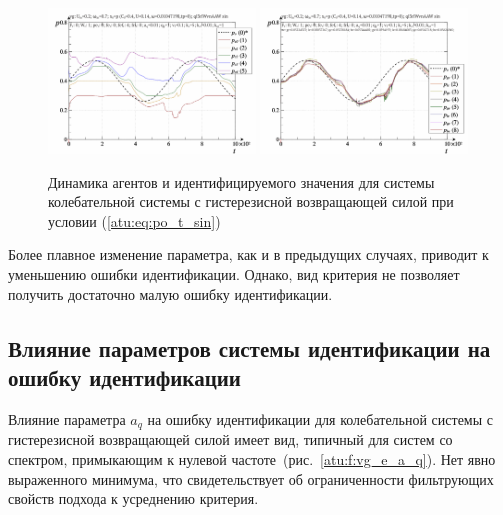 \begin{figure}[ht!]
\begin{center}
  \includegraphics[width=0.49\textwidth]{p/cha/vg/vg_id-p_t_pi_ql3rlWvnAAW_sin.png}
  \hfill
  \includegraphics[width=0.49\textwidth]{p/cha/vg/vg_id-p_t_p_ql3rlWvnAAW_sin.png}
\end{center}
  \caption{Динамика агентов и идентифицируемого значения для системы колебательной системы с гистерезисной возвращающей силой при условии (\ref{atu:eq:po_t_sin})}
\label{atu:f:vg_id_sin}
\end{figure}

Более плавное изменение параметра,
как и в предыдущих случаях,
приводит к уменьшению ошибки идентификации.
Однако, вид критерия не позволяет получить
достаточно малую ошибку идентификации.




\subsection{Влияние параметров системы идентификации на ошибку идентификации}  %

Влияние параметра $a_q$ на ошибку идентификации
для колебательной системы с гистерезисной возвращающей силой
имеет вид, типичный для систем со спектром,
примыкающим к нулевой частоте~(рис.~\ref{atu:f:vg_e_a_q}).
Нет явно выраженного минимума, что свидетельствует
об ограниченности фильтрующих свойств подхода к усреднению критерия.

